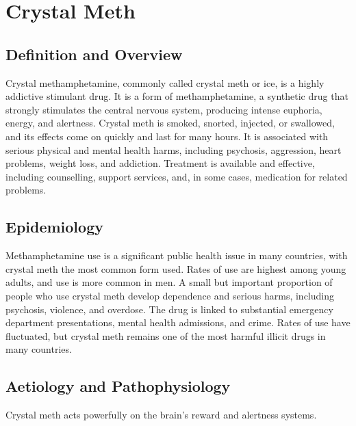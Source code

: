 \chapter{Crystal Meth}

\section*{Definition and Overview}
Crystal methamphetamine, commonly called crystal meth or ice, is a highly addictive stimulant drug. It is a form of methamphetamine, a synthetic drug that strongly stimulates the central nervous system, producing intense euphoria, energy, and alertness. Crystal meth is smoked, snorted, injected, or swallowed, and its effects come on quickly and last for many hours. It is associated with serious physical and mental health harms, including psychosis, aggression, heart problems, weight loss, and addiction. Treatment is available and effective, including counselling, support services, and, in some cases, medication for related problems.

\section*{Epidemiology}
Methamphetamine use is a significant public health issue in many countries, with crystal meth the most common form used. Rates of use are highest among young adults, and use is more common in men. A small but important proportion of people who use crystal meth develop dependence and serious harms, including psychosis, violence, and overdose. The drug is linked to substantial emergency department presentations, mental health admissions, and crime. Rates of use have fluctuated, but crystal meth remains one of the most harmful illicit drugs in many countries.

\section*{Aetiology and Pathophysiology}
Crystal meth acts powerfully on the brain's reward and alertness systems.

